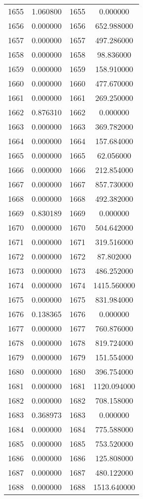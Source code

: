\documentclass[12pt]{article}
\begin{document}
\begin{longtable}{@{}cccc@{}}
1655 & 1.060800 & 1655 & 0.000000 \\
1656 & 0.000000 & 1656 & 652.988000 \\
1657 & 0.000000 & 1657 & 497.286000 \\
1658 & 0.000000 & 1658 & 98.836000 \\
1659 & 0.000000 & 1659 & 158.910000 \\
1660 & 0.000000 & 1660 & 477.670000 \\
1661 & 0.000000 & 1661 & 269.250000 \\
1662 & 0.876310 & 1662 & 0.000000 \\
1663 & 0.000000 & 1663 & 369.782000 \\
1664 & 0.000000 & 1664 & 157.684000 \\
1665 & 0.000000 & 1665 & 62.056000 \\
1666 & 0.000000 & 1666 & 212.854000 \\
1667 & 0.000000 & 1667 & 857.730000 \\
1668 & 0.000000 & 1668 & 492.382000 \\
1669 & 0.830189 & 1669 & 0.000000 \\
1670 & 0.000000 & 1670 & 504.642000 \\
1671 & 0.000000 & 1671 & 319.516000 \\
1672 & 0.000000 & 1672 & 87.802000 \\
1673 & 0.000000 & 1673 & 486.252000 \\
1674 & 0.000000 & 1674 & 1415.560000 \\
1675 & 0.000000 & 1675 & 831.984000 \\
1676 & 0.138365 & 1676 & 0.000000 \\
1677 & 0.000000 & 1677 & 760.876000 \\
1678 & 0.000000 & 1678 & 819.724000 \\
1679 & 0.000000 & 1679 & 151.554000 \\
1680 & 0.000000 & 1680 & 396.754000 \\
1681 & 0.000000 & 1681 & 1120.094000 \\
1682 & 0.000000 & 1682 & 708.158000 \\
1683 & 0.368973 & 1683 & 0.000000 \\
1684 & 0.000000 & 1684 & 775.588000 \\
1685 & 0.000000 & 1685 & 753.520000 \\
1686 & 0.000000 & 1686 & 125.808000 \\
1687 & 0.000000 & 1687 & 480.122000 \\
1688 & 0.000000 & 1688 & 1513.640000 \\

\end{longtable}
\end{document}
